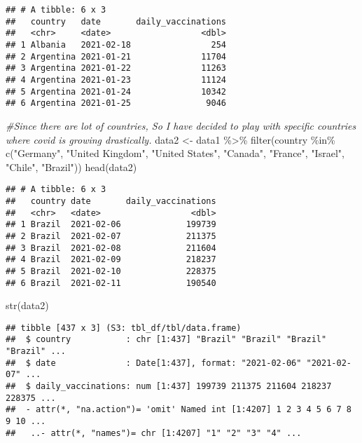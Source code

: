 \documentclass[
]{article}
\newenvironment{Shaded}{\begin{snugshade}}{\end{snugshade}}
\newcommand{\CommentTok}[1]{\textcolor[rgb]{0.56,0.35,0.01}{\textit{#1}}}
\newcommand{\FunctionTok}[1]{\textcolor[rgb]{0.00,0.00,0.00}{#1}}
\newcommand{\NormalTok}[1]{#1}
\newcommand{\OtherTok}[1]{\textcolor[rgb]{0.56,0.35,0.01}{#1}}
\newcommand{\SpecialCharTok}[1]{\textcolor[rgb]{0.00,0.00,0.00}{#1}}
\newcommand{\StringTok}[1]{\textcolor[rgb]{0.31,0.60,0.02}{#1}}
\begin{document}
\begin{verbatim}
## # A tibble: 6 x 3
##   country   date       daily_vaccinations
##   <chr>     <date>                  <dbl>
## 1 Albania   2021-02-18                254
## 2 Argentina 2021-01-21              11704
## 3 Argentina 2021-01-22              11263
## 4 Argentina 2021-01-23              11124
## 5 Argentina 2021-01-24              10342
## 6 Argentina 2021-01-25               9046
\end{verbatim}

\begin{Shaded}
\begin{Highlighting}[]
\CommentTok{\#Since there are lot of countries, So I have decided to play with specific countries where covid is growing drastically. }
\NormalTok{data2 }\OtherTok{\textless{}{-}}\NormalTok{ data1 }\SpecialCharTok{\%\textgreater{}\%}
  \FunctionTok{filter}\NormalTok{(country }\SpecialCharTok{\%in\%} \FunctionTok{c}\NormalTok{(}\StringTok{"Germany"}\NormalTok{, }\StringTok{"United Kingdom"}\NormalTok{, }\StringTok{"United States"}\NormalTok{, }\StringTok{"Canada"}\NormalTok{, }\StringTok{"France"}\NormalTok{, }\StringTok{"Israel"}\NormalTok{, }\StringTok{"Chile"}\NormalTok{, }\StringTok{"Brazil"}\NormalTok{))}
\FunctionTok{head}\NormalTok{(data2)}
\end{Highlighting}
\end{Shaded}

\begin{verbatim}
## # A tibble: 6 x 3
##   country date       daily_vaccinations
##   <chr>   <date>                  <dbl>
## 1 Brazil  2021-02-06             199739
## 2 Brazil  2021-02-07             211375
## 3 Brazil  2021-02-08             211604
## 4 Brazil  2021-02-09             218237
## 5 Brazil  2021-02-10             228375
## 6 Brazil  2021-02-11             190540
\end{verbatim}

\begin{Shaded}
\begin{Highlighting}[]
\FunctionTok{str}\NormalTok{(data2)}
\end{Highlighting}
\end{Shaded}

\begin{verbatim}
## tibble [437 x 3] (S3: tbl_df/tbl/data.frame)
##  $ country           : chr [1:437] "Brazil" "Brazil" "Brazil" "Brazil" ...
##  $ date              : Date[1:437], format: "2021-02-06" "2021-02-07" ...
##  $ daily_vaccinations: num [1:437] 199739 211375 211604 218237 228375 ...
##  - attr(*, "na.action")= 'omit' Named int [1:4207] 1 2 3 4 5 6 7 8 9 10 ...
##   ..- attr(*, "names")= chr [1:4207] "1" "2" "3" "4" ...
\end{verbatim}
\end{document}
